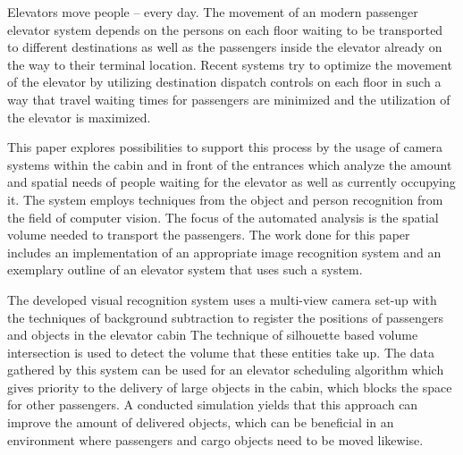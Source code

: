 \hspace{2cm}

Elevators move people -- every day.
The movement of an modern passenger elevator system depends on the persons on
each floor waiting to be transported to different destinations as well as the
passengers inside the elevator already on the way to their terminal location.
Recent systems try to optimize the movement of the elevator by utilizing
destination dispatch controls on each floor in such a way that travel
waiting times for passengers are minimized and the utilization of the elevator
is maximized.

This paper explores possibilities to support this process by the usage of
camera systems within the cabin and in front of the entrances which analyze
the amount and spatial needs of people waiting for the elevator as well as
currently occupying it.
The system employs techniques from the object and person recognition
from the field of computer vision.
The focus of the automated analysis is the spatial volume needed to
transport the passengers.
The work done for this paper includes an implementation of an appropriate
image recognition system and an exemplary outline of an elevator system
that uses such a system.

The developed visual recognition system uses a multi-view camera set-up with the techniques of background subtraction to register the positions of passengers and objects in the elevator cabin
The technique of silhouette based volume intersection is used to detect the volume that these entities take up.
The data gathered by this system can be used for an elevator scheduling algorithm which gives priority to the delivery of large objects in the cabin, which blocks the space for other passengers.
A conducted simulation yields that this approach can improve the 
amount of delivered objects, which can be beneficial in an environment where passengers and cargo objects need to be moved likewise. 

